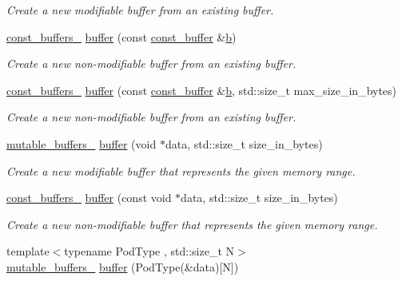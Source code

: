 \begin{DoxyCompactItemize}
\begin{DoxyCompactList}\small\item\em Create a new modifiable buffer from an existing buffer. \end{DoxyCompactList}\item 
\hyperlink{classasio_1_1const__buffers__1}{const\+\_\+buffers\+\_} \hyperlink{group__buffer_gac00b079c860c589f80a312b975828780}{buffer} (const \hyperlink{classasio_1_1const__buffer}{const\+\_\+buffer} \&\hyperlink{group__async__read_ga945a5c18fa77a9e2eba420f8f44b2a4f}{b})
\begin{DoxyCompactList}\small\item\em Create a new non-\/modifiable buffer from an existing buffer. \end{DoxyCompactList}\item 
\hyperlink{classasio_1_1const__buffers__1}{const\+\_\+buffers\+\_} \hyperlink{group__buffer_gafe2a3b8cbb0e8aefbc870d5f43cf5872}{buffer} (const \hyperlink{classasio_1_1const__buffer}{const\+\_\+buffer} \&\hyperlink{group__async__read_ga945a5c18fa77a9e2eba420f8f44b2a4f}{b}, std\+::size\+\_\+t max\+\_\+size\+\_\+in\+\_\+bytes)
\begin{DoxyCompactList}\small\item\em Create a new non-\/modifiable buffer from an existing buffer. \end{DoxyCompactList}\item 
\hyperlink{classasio_1_1mutable__buffers__1}{mutable\+\_\+buffers\+\_} \hyperlink{group__buffer_gaa066734007c417692255c8f515f0fb01}{buffer} (void $\ast$data, std\+::size\+\_\+t size\+\_\+in\+\_\+bytes)
\begin{DoxyCompactList}\small\item\em Create a new modifiable buffer that represents the given memory range. \end{DoxyCompactList}\item 
\hyperlink{classasio_1_1const__buffers__1}{const\+\_\+buffers\+\_} \hyperlink{group__buffer_gaa6b6109423e7efc76b46b8d1337a5b0f}{buffer} (const void $\ast$data, std\+::size\+\_\+t size\+\_\+in\+\_\+bytes)
\begin{DoxyCompactList}\small\item\em Create a new non-\/modifiable buffer that represents the given memory range. \end{DoxyCompactList}\item 
{\footnotesize template$<$typename Pod\+Type , std\+::size\+\_\+t N$>$ }\\\hyperlink{classasio_1_1mutable__buffers__1}{mutable\+\_\+buffers\+\_} \hyperlink{group__buffer_ga9a348932d9b7ffda26ff318191489fd8}{buffer} (Pod\+Type(\&data)\mbox{[}N\mbox{]})

\end{DoxyCompactItemize}
